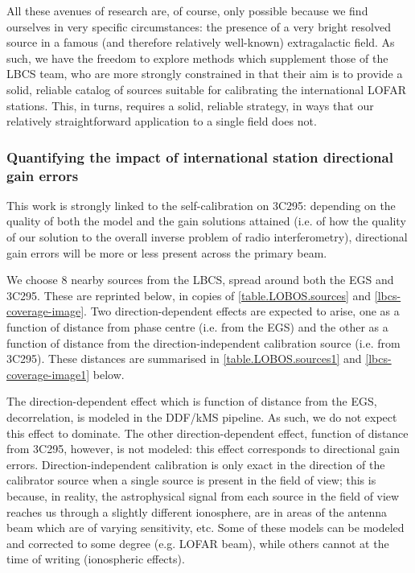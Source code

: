 \pg
All these avenues of research are, of course, only possible because we find ourselves in very specific circumstances: the presence of a very bright resolved source in a famous (and therefore relatively well-known) extragalactic field. As such, we have the freedom to explore methods which supplement those of the LBCS team, who are more strongly constrained in that their aim is to provide a solid, reliable catalog of sources suitable for calibrating the international LOFAR stations. This, in turns, requires a solid, reliable strategy, in ways that our relatively straightforward application to a single field does not.

\subsubsection{Quantifying the impact of international station directional gain errors}

\pg
This work is strongly linked to the self-calibration on 3C295: depending on the quality of both the model and the gain solutions attained (i.e. of how the quality of our solution to the overall inverse problem of radio interferometry), directional gain errors will be more or less present across the primary beam.

\pg
We choose 8 nearby sources from the LBCS, spread around both the EGS and 3C295. These are reprinted below, in copies of \cref{table.LOBOS.sources} and \cref{lbcs-coverage-image}. Two direction-dependent effects are expected to arise, one as a function of distance from phase centre (i.e. from the EGS) and the other as a function of distance from the direction-independent calibration source (i.e. from 3C295). These distances are summarised  in \cref{table.LOBOS.sources1} and \cref{lbcs-coverage-image1} below.


\pg
The direction-dependent effect which is function of distance from the EGS, decorrelation, is modeled in the DDF/kMS pipeline. As such, we do not expect this effect to dominate. The other direction-dependent effect, function of distance from 3C295, however, is not modeled: this effect corresponds to directional gain errors. Direction-independent calibration is only exact in the direction of the calibrator source when a single source is present in the field of view; this is because, in reality, the astrophysical signal from each source in the field of view reaches us through a slightly different ionosphere, are in areas of the antenna beam which are 
of varying sensitivity, etc. Some of these models can be modeled and corrected to some degree (e.g. LOFAR beam), while others cannot at the time of writing (ionospheric effects). 

